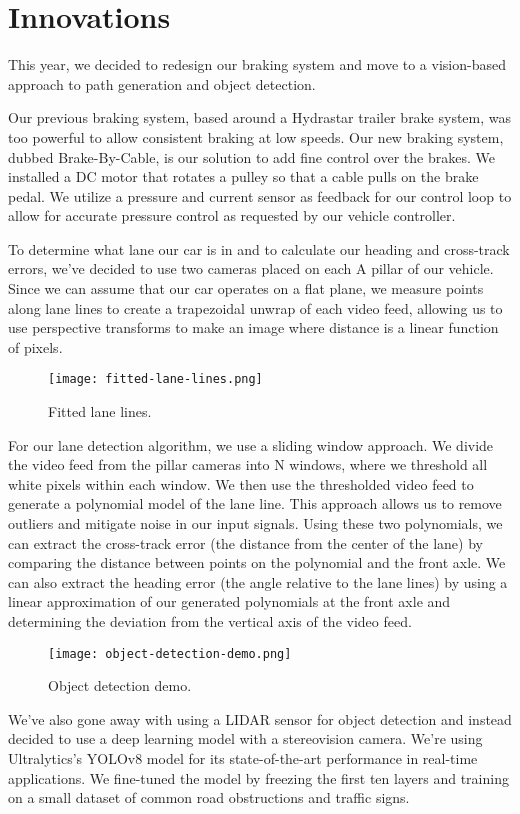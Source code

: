 \section{Innovations}

This year, we decided to redesign our braking system and move to a
vision-based approach to path generation and object detection.

Our previous braking system, based around a Hydrastar trailer brake
system, was too powerful to allow consistent braking at low speeds. Our
new braking system, dubbed Brake-By-Cable, is our solution to add fine
control over the brakes. We installed a DC motor that rotates a pulley
so that a cable pulls on the brake pedal. We utilize a pressure and
current sensor as feedback for our control loop to allow for accurate
pressure control as requested by our vehicle controller.

To determine what lane our car is in and to calculate our heading and
cross-track errors, we've decided to use two cameras placed on each A
pillar of our vehicle. Since we can assume that our car operates on a
flat plane, we measure points along lane lines to create a trapezoidal
unwrap of each video feed, allowing us to use perspective transforms to
make an image where distance is a linear function of pixels.

\begin{figure}[ht!]
  \centering
  \texttt{[image: fitted-lane-lines.png]}
  \caption{Fitted lane lines.}
\end{figure}

For our lane detection algorithm, we use a sliding window approach. We
divide the video feed from the pillar cameras into N windows, where we
threshold all white pixels within each window. We then use the
thresholded video feed to generate a polynomial model of the lane line.
This approach allows us to remove outliers and mitigate noise in our
input signals. Using these two polynomials, we can extract the
cross-track error (the distance from the center of the lane) by
comparing the distance between points on the polynomial and the front
axle. We can also extract the heading error (the angle relative to the
lane lines) by using a linear approximation of our generated
polynomials at the front axle and determining the deviation from the
vertical axis of the video feed.

\newpage

\begin{figure}[ht!]
  \centering
  \texttt{[image: object-detection-demo.png]}
  \caption{Object detection demo.}
\end{figure}

We've also gone away with using a LIDAR sensor for object detection and
instead decided to use a deep learning model with a stereovision
camera. We're using Ultralytics's YOLOv8 model for its state-of-the-art
performance in real-time applications. We fine-tuned the model by
freezing the first ten layers and training on a small dataset of common
road obstructions and traffic signs.
